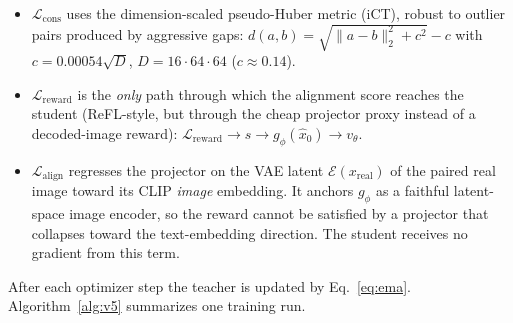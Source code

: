 \documentclass[10pt]{article}
\newcommand{\xhat}{\hat{x}_0}
\begin{document}
\begin{itemize}
\item $\mathcal{L}_{\mathrm{cons}}$ uses the dimension-scaled pseudo-Huber
metric (iCT), robust to outlier pairs produced by aggressive gaps:
$d(a, b) = \sqrt{ \lVert a - b \rVert_2^2 + c^2 } - c$ with
$c = 0.00054 \sqrt{D}$, $D = 16 \cdot 64 \cdot 64$ ($c \approx 0.14$).
\item $\mathcal{L}_{\mathrm{reward}}$ is the \emph{only} path through which
the alignment score reaches the student (ReFL-style, but through the cheap
projector proxy instead of a decoded-image reward):
$\mathcal{L}_{\mathrm{reward}} \to s \to g_\phi(\xhat) \to v_\theta$.
\item $\mathcal{L}_{\mathrm{align}}$ regresses the projector on the VAE
latent $\mathcal{E}(x_{\mathrm{real}})$ of the paired real image toward its
CLIP \emph{image} embedding. It anchors $g_\phi$ as a faithful latent-space
image encoder, so the reward cannot be satisfied by a projector that
collapses toward the text-embedding direction. The student receives no
gradient from this term.
\end{itemize}
After each optimizer step the teacher is updated by Eq.~\eqref{eq:ema}.
Algorithm~\ref{alg:v5} summarizes one training run.
\end{document}
